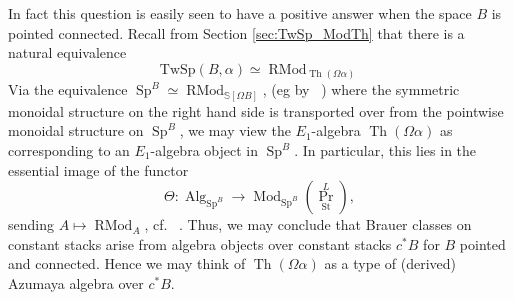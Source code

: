 \documentclass[10pt]{amsart}
\theoremstyle{plain}
\theoremstyle{definition}
\DeclareMathOperator{\Mod}{Mod}
\DeclareMathOperator{\Sp}{Sp}
\DeclareMathOperator{\Th}{Th}
\def\on{\operatorname}
\newcommand{\St}{\mathrm{St}}
\newcommand{\bS}{\mathbb{S}}
\newcommand{\TwSp}{\mathrm{TwSp}}
\begin{document}
In fact this question is easily seen to have a positive answer when the space $B$ is pointed connected. Recall from Section \ref{sec:TwSp_ModTh} that there is a natural equivalence
\[
\TwSp(B, \alpha) \simeq \on{RMod}_{\Th(\Omega \alpha)}
\]
Via the equivalence $\Sp^{B} \simeq \on{RMod}_{\bS[\Omega B]}$, (eg by ~\cite[Lemma 4.46]{CCRY23}) where the symmetric monoidal structure on the right hand side is transported over from the pointwise monoidal structure on $\Sp^{B}$, we may  view the $E_1$-algebra  $\Th(\Omega \alpha)$ as corresponding to an $E_1$-algebra object in $ \Sp^{B}$. In particular, this lies in the essential image of the functor
\[
\Theta: \on{Alg}_{\Sp^{B}} \to \Mod_{\Sp^{B}}(\on{Pr}^{L}_{\St}),
\]
sending
$A \mapsto \on{RMod}_A$, cf. ~\cite[Remark 4.8.5.17]{HA}.
Thus, we may conclude that Brauer classes on constant stacks arise from algebra objects over constant stacks  $c^*B$ for $B$ pointed  and connected. Hence we may think of $\Th(\Omega \alpha)$ as a type of (derived) Azumaya algebra over $c^*B$.
\end{document}
